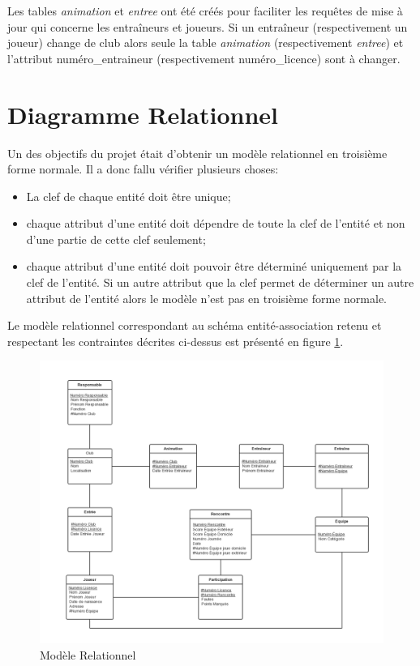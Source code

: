 \documentclass[a4paper,12pt]{article}
\begin{document}
Les tables \emph{animation} et \emph{entree} ont été créés pour faciliter les requêtes de mise à jour qui concerne les entraîneurs et joueurs. Si un entraîneur (respectivement un joueur) change de club alors seule la table \emph{animation} (respectivement \emph{entree}) et l'attribut numéro\_entraineur (respectivement numéro\_licence) sont à changer.\\

\section{Diagramme Relationnel}
Un des objectifs du projet était d'obtenir un modèle relationnel en troisième forme normale. Il a donc fallu vérifier plusieurs choses:
\begin{itemize}
\item La clef de chaque entité doit être unique;
\item chaque attribut d'une entité doit dépendre de toute la clef de l'entité et non d'une partie de cette clef seulement;
\item chaque attribut d'une entité doit pouvoir être déterminé uniquement par la clef de l'entité. Si un autre attribut que la clef permet de déterminer un autre attribut de l'entité alors le modèle n'est pas en troisième forme normale.
\end{itemize}
Le modèle relationnel correspondant au schéma entité-association retenu et respectant les contraintes décrites ci-dessus est présenté en figure \ref{ModeleRela}.
\begin{figure}[!h]
\centering
\includegraphics[scale=0.4]{ModeleRela.png}
\caption{Modèle Relationnel\label{ModeleRela}}
\end{figure}
\end{document}
